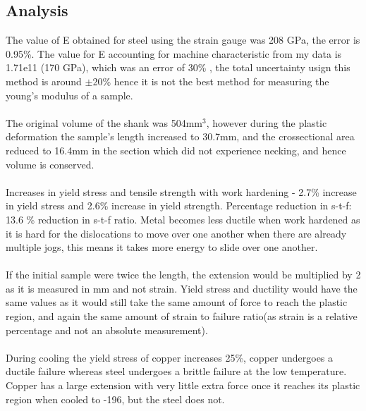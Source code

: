 \documentclass[12pt]{article}
\begin{document}
        \subsection{Analysis}
            The value of E obtained for steel using the strain gauge was 208 GPa, the error is 0.95\%. The value for E accounting for
            machine characteristic from my data is 1.71e11 (170 GPa), which was an error of 30\% , the total uncertainty usign this
            method is around $\pm$20\% hence it is not the best method for measuring the young's modulus of a sample. \\ \\
            The original volume of the shank was 504mm$^3$, however during the plastic deformation the sample's length increased to 30.7mm, and 
            the crossectional area reduced to 16.4mm in the section which did not experience necking, and hence volume is conserved.  \\ \\
            Increases in yield stress and tensile strength with work hardening - 2.7\% increase in yield stress and 2.6\% increase in yield strength.
            Percentage reduction in s-t-f: 13.6 \% reduction in s-t-f ratio. 
            Metal becomes less ductile when work hardened as it is hard for the dislocations to move over one another when there are already
            multiple jogs, this means it takes more energy to slide over one another. \\ \\
            If the initial sample were twice the length, the extension would be multiplied by 2 as it is measured in mm and not strain. Yield
            stress and ductility would have the same values as it would still take the same amount of force to reach the plastic region, and again
            the same amount of strain to failure ratio(as strain is a relative percentage and not an absolute measurement). \\ \\
            During cooling the yield stress of copper increases 25\%, copper undergoes a ductile failure whereas steel undergoes a brittle failure
            at the low temperature. Copper has a large extension with very little extra force once it reaches its plastic region when cooled to -196,
            but the steel does not.
\end{document}
